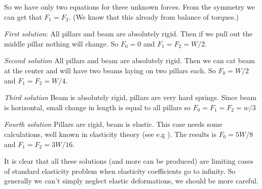    So we have only two equations for three
unknown forces. From the symmetry we can get that $F_1=F_2$. 
(We know that this already from balance of torques.)

{\em First solution}:
All pillars and beam are absolutely rigid. Then
if we pull out the middle pillar nothing will change.
So $F_0=0$ and $F_1=F_2=W/2$.

{\em Second solution}
All pillars and beam are absolutely rigid. Then
we can cat beam at the center and will have two
beams laying on two pillars each.
So $F_0=W/2$ and $F_1=F_2=W/4$.

{\em Third solution}
Beam is absolutely rigid, pillars are very hard springs.
Since beam is horizontal, small change in length is 
equal to all pillars so $F_0=F_1=F_2=w/3$


{\em Fourth solution}
Pillars are rigid, beam is elastic. This case needs
some calculations, well known in elasticity theory
(see e.g \cite {Landau-Lifshitz-7}).
The results is $F_0=5 W/8$ and $F_1=F_2=3 W/16$.

It is clear that all these solutions (and more can be
produced) are limiting cases of standard elasticity 
problem when elasticity coefficients go to infinity.
So generally we can't simply neglect elastic deformations,
we should be more careful.


